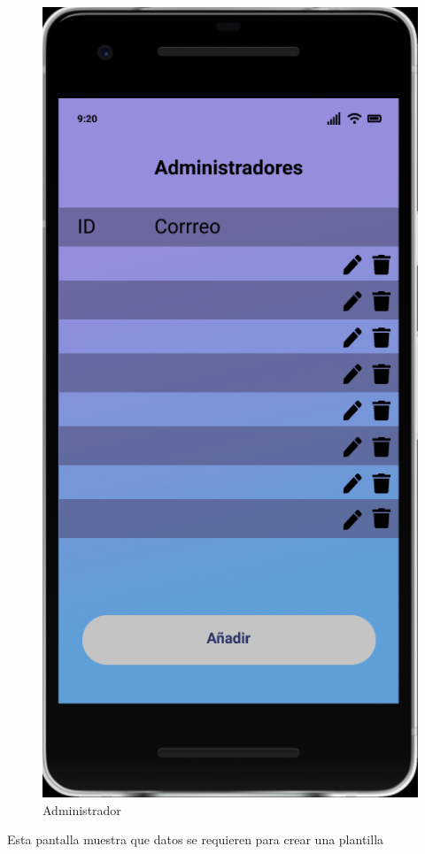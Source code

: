 \documentclass{article}
\begin{document}
\begin{figure}[H]
    \centering
    \includegraphics[scale=0.8]{imgs/Figma/Admins}
    \caption{Administrador}
\end{figure}
Esta pantalla muestra que datos se requieren para crear una plantilla
\end{document}
